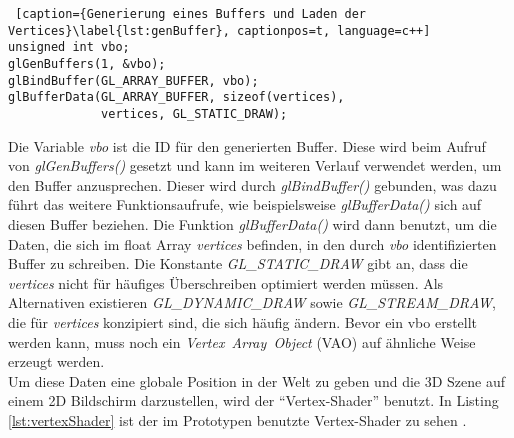 \documentclass[11pt,a4paper]{article}
\begin{document}
\begin{lstlisting} [caption={Generierung eines Buffers und Laden der Vertices}\label{lst:genBuffer}, captionpos=t, language=c++]
unsigned int vbo;
glGenBuffers(1, &vbo);
glBindBuffer(GL_ARRAY_BUFFER, vbo);
glBufferData(GL_ARRAY_BUFFER, sizeof(vertices),
             vertices, GL_STATIC_DRAW);
\end{lstlisting}
\noindent
Die Variable \textit{vbo} ist die ID für den generierten Buffer. Diese wird beim Aufruf von \mbox{\textit{glGenBuffers()}} gesetzt und kann im weiteren Verlauf verwendet werden, um den Buffer anzusprechen. Dieser wird durch \mbox{\textit{glBindBuffer()}} gebunden, was dazu führt das weitere Funktionsaufrufe, wie beispielsweise \mbox{\textit{glBufferData()}} sich auf diesen Buffer beziehen. Die Funktion \mbox{\textit{glBufferData()}} wird dann benutzt, um die Daten, die sich im float Array \mbox{\textit{vertices}} befinden, in den durch \mbox{\textit{vbo}} identifizierten Buffer zu schreiben. Die Konstante \mbox{\textit{GL\_STATIC\_DRAW}} gibt an, dass die \mbox{\textit{vertices}} nicht für häufiges Überschreiben optimiert werden müssen. Als Alternativen existieren \mbox{\textit{GL\_DYNAMIC\_DRAW}} sowie \mbox{\textit{GL\_STREAM\_DRAW}}, die für \mbox{\textit{vertices}} konzipiert sind, die sich häufig ändern. Bevor ein vbo erstellt werden kann, muss noch ein \mbox{\textit{Vertex Array Object}} (VAO) auf ähnliche Weise erzeugt werden.\\
Um diese Daten eine globale Position in der Welt zu geben und die 3D Szene auf einem 2D Bildschirm darzustellen, wird der ``Vertex-Shader'' benutzt. In Listing \ref{lst:vertexShader} ist der im Prototypen benutzte Vertex-Shader zu sehen \cite[Coordinate Systems]{LearnOpenGL}.
\end{document}
